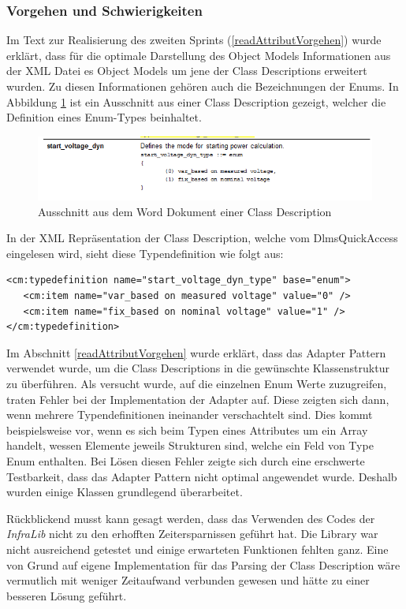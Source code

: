 \subsubsection{Vorgehen und Schwierigkeiten}
Im Text zur Realisierung des zweiten Sprints (\ref{readAttributVorgehen}) wurde erklärt, dass für die optimale Darstellung des Object Models Informationen aus der XML Datei es Object Models um jene der Class Descriptions erweitert wurden.
Zu diesen Informationen gehören auch die Bezeichnungen der Enums.
In Abbildung \ref{fig:enumTypedefword} ist ein Ausschnitt aus einer Class Description gezeigt, welcher die Definition eines Enum-Types beinhaltet.
\begin{figure}
   \centering
   \includegraphics[width=1.0\textwidth]{gfx/enum_typedef_word.png}
   \caption{
      Ausschnitt aus dem Word Dokument einer Class Description
      }
      \label{fig:enumTypedefword}
\end{figure}
In der XML Repräsentation der Class Description, welche vom DlmsQuickAccess eingelesen wird, sieht diese Typendefinition wie folgt aus:
\begin{verbatim}
<cm:typedefinition name="start_voltage_dyn_type" base="enum">
   <cm:item name="var_based on measured voltage" value="0" />
   <cm:item name="fix_based on nominal voltage" value="1" />
</cm:typedefinition>
\end{verbatim}

Im Abschnitt \ref{readAttributVorgehen} wurde erklärt, dass das Adapter Pattern verwendet wurde, um die Class Descriptions in die gewünschte Klassenstruktur zu überführen.
Als versucht wurde, auf die einzelnen Enum Werte zuzugreifen, traten Fehler bei der Implementation der Adapter auf.
Diese zeigten sich dann, wenn mehrere Typendefinitionen ineinander verschachtelt sind.
Dies kommt beispielsweise vor, wenn es sich beim Typen eines Attributes um ein Array handelt, wessen Elemente jeweils Strukturen sind, welche ein Feld von Type Enum enthalten.
Bei Lösen diesen Fehler zeigte sich durch eine erschwerte Testbarkeit, dass das Adapter Pattern nicht optimal angewendet wurde.
Deshalb wurden einige Klassen grundlegend überarbeitet.

Rückblickend musst kann gesagt werden, dass das Verwenden des Codes der \textit{InfraLib} nicht zu den erhofften Zeitersparnissen geführt hat.
Die Library war nicht ausreichend getestet und einige erwarteten Funktionen fehlten ganz.
Eine von Grund auf eigene Implementation für das Parsing der Class Description wäre vermutlich mit weniger Zeitaufwand verbunden gewesen und hätte zu einer besseren Lösung geführt.

